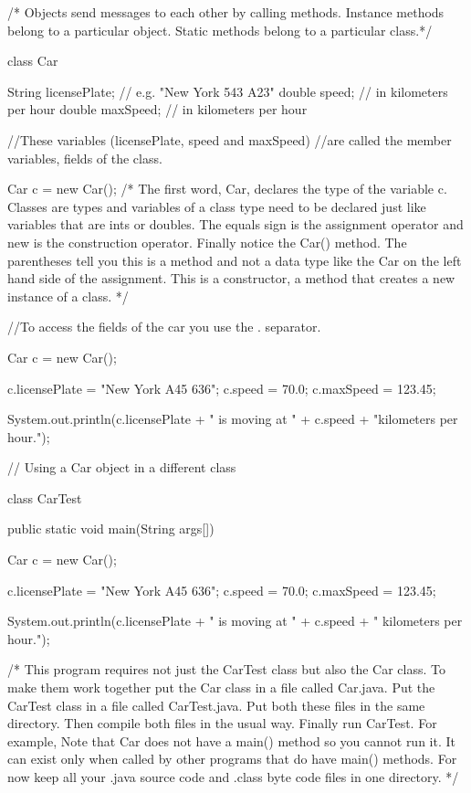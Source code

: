 /* Objects send messages to each other by calling methods.
Instance methods belong to a particular object.
Static methods belong to a particular class.*/

class Car {

  String licensePlate; // e.g. "New York 543 A23"
  double speed;        // in kilometers per hour
  double maxSpeed;     // in kilometers per hour

}
//These variables (licensePlate, speed and maxSpeed) 
//are called the member variables, fields of the class.


Car c = new Car();
/*
The first word, Car, declares the type of the variable c.
Classes are types and variables of a class type need to 
be declared just like variables that are ints or doubles.
The equals sign is the assignment operator and new is the 
construction operator.
Finally notice the Car() method. 
The parentheses tell you this is a method and not a data type 
like the Car on the left hand side of the assignment. 
This is a constructor, a method that creates a new instance of a class.
*/


//To access the fields of the car you use the . separator.

Car c = new Car();

c.licensePlate = "New York A45 636";
c.speed = 70.0;
c.maxSpeed = 123.45;

System.out.println(c.licensePlate + " is moving at " + c.speed + 
  "kilometers per hour.");

// Using a Car object in a different class

class CarTest {

  public static void main(String args[]) {
    
    Car c = new Car();
    
    c.licensePlate = "New York A45 636";
    c.speed = 70.0;
    c.maxSpeed = 123.45;
    
    System.out.println(c.licensePlate + " is moving at " + c.speed + 
      " kilometers per hour.");    
  }
  
}

/*
This program requires not just the CarTest class but also the 
Car class. To make them work together put the Car class in a file 
called Car.java. Put the CarTest class in a file called 
CarTest.java. Put both these files in the same directory.
Then compile both files in the usual way. 
Finally run CarTest. 
For example,
Note that Car does not have a main() method so you cannot run it. 
It can exist only when called by other programs that do have main() 
methods.
For now keep all your .java source code and .class byte code files in one directory.
*/

